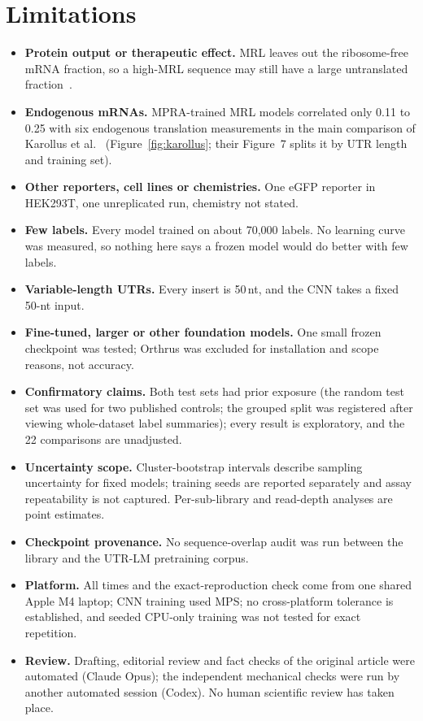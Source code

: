 \documentclass[11pt]{article}
\begin{document}
\section{Limitations}\label{sec:limitations}
\begin{itemize}
\item \textbf{Protein output or therapeutic effect.} MRL leaves out the ribosome-free mRNA fraction, so a high-MRL
sequence may still have a large untranslated fraction~\citep{castillohair2024}.
\item \textbf{Endogenous mRNAs.} MPRA-trained MRL models correlated only 0.11 to 0.25 with six endogenous translation
measurements in the main comparison of Karollus et al.~\citep{karollus2021} (Figure~\ref{fig:karollus}; their
Figure~7 splits it by UTR length and training set).
\item \textbf{Other reporters, cell lines or chemistries.} One eGFP reporter in HEK293T, one unreplicated run,
chemistry not stated.
\item \textbf{Few labels.} Every model trained on about 70,000 labels. No learning curve was measured, so nothing here
says a frozen model would do better with few labels.
\item \textbf{Variable-length UTRs.} Every insert is 50\,nt, and the CNN takes a fixed 50-nt input.
\item \textbf{Fine-tuned, larger or other foundation models.} One small frozen checkpoint was tested; Orthrus was
excluded for installation and scope reasons, not accuracy.
\item \textbf{Confirmatory claims.} Both test sets had prior exposure (the random test set was used for two published
controls; the grouped split was registered after viewing whole-dataset label summaries); every result is exploratory,
and the 22 comparisons are unadjusted.
\item \textbf{Uncertainty scope.} Cluster-bootstrap intervals describe sampling uncertainty for fixed models; training
seeds are reported separately and assay repeatability is not captured. Per-sub-library and read-depth analyses are
point estimates.
\item \textbf{Checkpoint provenance.} No sequence-overlap audit was run between the library and the UTR-LM pretraining
corpus.
\item \textbf{Platform.} All times and the exact-reproduction check come from one shared Apple M4 laptop; CNN training
used MPS; no cross-platform tolerance is established, and seeded CPU-only training was not tested for exact
repetition.
\item \textbf{Review.} Drafting, editorial review and fact checks of the original article were automated (Claude Opus);
the independent mechanical checks were run by another automated session (Codex). No human scientific review has taken
place.
\end{itemize}
\end{document}
